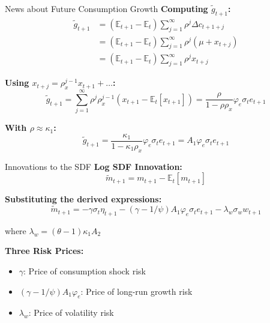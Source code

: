 \documentclass{beamer}
\newcommand{\E}{\mathbb{E}}
\newcommand{\tld}[1]{\widetilde{#1}}
\begin{document}
\begin{frame}{News about Future Consumption Growth}
    \textbf{Computing $\tld{g}_{t+1}$:}
    \begin{align}
        \tld{g}_{t+1} &= (\E_{t+1} - \E_t) \sum_{j=1}^{\infty} \rho^j \Delta c_{t+1+j} \nonumber \\
        &= (\E_{t+1} - \E_t) \sum_{j=1}^{\infty} \rho^j (\mu + x_{t+j}) \nonumber \\
        &= (\E_{t+1} - \E_t) \sum_{j=1}^{\infty} \rho^j x_{t+j}
    \end{align}
    
    \textbf{Using $x_{t+j} = \rho_x^{j-1} x_{t+1} + \ldots$:}
    \begin{equation}
        \tld{g}_{t+1} = \sum_{j=1}^{\infty} \rho^j \rho_x^{j-1} (x_{t+1} - \E_t[x_{t+1}]) = \frac{\rho}{1-\rho \rho_x} \varphi_e \sigma_t e_{t+1}
    \end{equation}
    
    \textbf{With $\rho \approx \kappa_1$:}
    \begin{equation}
        \tld{g}_{t+1} = \frac{\kappa_1}{1-\kappa_1 \rho_x} \varphi_e \sigma_t e_{t+1} = A_1 \varphi_e \sigma_t e_{t+1}
    \end{equation}
\end{frame}

\begin{frame}{Innovations to the SDF}
    \textbf{Log SDF Innovation:}
    \begin{equation}
        \tld{m}_{t+1} = m_{t+1} - \E_t[m_{t+1}]
    \end{equation}
    
    \textbf{Substituting the derived expressions:}
    \begin{equation}
        \boxed{\tld{m}_{t+1} = -\gamma \sigma_t \eta_{t+1} - (\gamma - 1/\psi) A_1 \varphi_e \sigma_t e_{t+1} - \lambda_w \sigma_w w_{t+1}}
    \end{equation}
    
    where $\lambda_w = (\theta - 1) \kappa_1 A_2$
    
    \vspace{0.3cm}
    \textbf{Three Risk Prices:}
    \begin{itemize}
        \item $\gamma$: Price of consumption shock risk
        \item $(\gamma - 1/\psi) A_1 \varphi_e$: Price of long-run growth risk
        \item $\lambda_w$: Price of volatility risk
    \end{itemize}
\end{frame}
\end{document}
